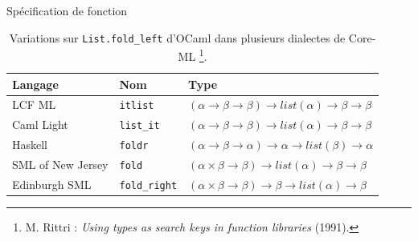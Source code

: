 \documentclass[serif]{beamer}
\begin{document}
\begin{frame}{Spécification de fonction}
\footnotesize
\begin{table}[h]
  \centering
  \begin{tabular}{|l|l|l|}
    \hline
      Langage &
      Nom &
      Type
    \\
    \hline
      LCF ML &
      \texttt{itlist} &
      $(\alpha \rightarrow \beta \rightarrow \beta) \rightarrow list (\alpha) \rightarrow \beta \rightarrow \beta$
    \\
      Caml Light &
      \texttt{list\_it} &
      $(\alpha \rightarrow \beta \rightarrow \beta) \rightarrow list (\alpha) \rightarrow \beta \rightarrow \beta$
    \\
      Haskell &
      \texttt{foldr} &
      $(\alpha \rightarrow \beta \rightarrow \alpha) \rightarrow \alpha \rightarrow list (\beta) \rightarrow \alpha$
    \\
      SML of New Jersey &
      \texttt{fold} &
      $(\alpha \times \beta \rightarrow \beta) \rightarrow list (\alpha) \rightarrow \beta \rightarrow \beta$
    \\
      Edinburgh SML &
      \texttt{fold\_right} &
      $(\alpha \times \beta \rightarrow \beta) \rightarrow \beta \rightarrow list (\alpha) \rightarrow \beta$
    \\
    \hline
  \end{tabular}
  \caption*{Variations sur \texttt{List.fold\_left} d'OCaml dans plusieurs dialectes de Core-ML \footnote{M. Rittri : \textit{Using types as search keys in function libraries} (1991).}.}
\end{table}
\end{frame}

\end{document}
